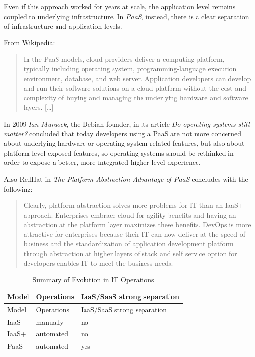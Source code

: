 Even if this approach worked for years at scale, the application level
remains coupled to underlying infrastructure. In \textit{PaaS}, instead,
there is a clear separation of infrastructure and application levels.

From Wikipedia:

\begin{quote}
In the PaaS models, cloud providers deliver a computing platform,
typically including operating system, programming-language execution
environment, database, and web server. Application developers can
develop and run their software solutions on a cloud platform without the
cost and complexity of buying and managing the underlying hardware and
software layers. {[}\ldots{}{]}
\end{quote}

In 2009 \textit{Ian Murdock}, the Debian founder, in its article \textit{Do
operating systems still matter?}\cite{DoOperatingSystemsStillMatter}
concluded that today developers using a PaaS are not more concerned
about underlying hardware or operating system related features, but also
about platform-level exposed features, so operating systems should be
rethinked in order to expose a better, more integrated higher level
experience.

Also RedHat in \textit{The Platform Abstraction Advantage of
PaaS}\cite{ThePlatformAbstractionAdvantageOfPaaS} concludes with the
following:

\begin{quote}
Clearly, platform abstraction solves more problems for IT than an IaaS+
approach. Enterprises embrace cloud for agility benefits and having an
abstraction at the platform layer maximizes these benefits. DevOps is
more attractive for enterprises because their IT can now deliver at the
speed of business and the standardization of application development
platform through abstraction at higher layers of stack and self service
option for developers enables IT to meet the business needs.
\end{quote}

\begin{longtable}[c]{@{}lll@{}}
\caption{Summary of Evolution in IT Operations}\tabularnewline
\toprule
Model & Operations & IaaS/SaaS strong separation\tabularnewline
\midrule
\endfirsthead
\toprule
Model & Operations & IaaS/SaaS strong separation\tabularnewline
\midrule
\endhead
IaaS & manually & no\tabularnewline
IaaS+ & automated & no\tabularnewline
PaaS & automated & yes\tabularnewline
\bottomrule
\end{longtable}

